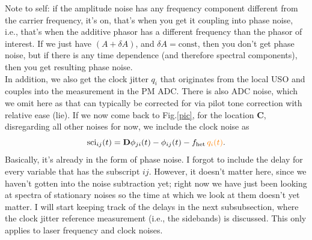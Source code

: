 \documentclass[11pt]{article}
\begin{document}
\noindent
Note to self: if the amplitude noise has any frequency component different from the carrier frequency, it's on, that's when you get it coupling into phase noise, i.e., that's when the additive phasor has a different frequency than the phasor of interest. If we just have $(A + \delta A)$, and $\delta A = \text{const}$, then you don't get phase noise, but if there is any time dependence (and therefore spectral components), then you get resulting phase noise.\\
\newline
In addition, we also get the clock jitter $q_i$ that originates from the local USO and couples into the measurement in the PM ADC. There is also ADC noise, which we omit here as that can typically be corrected for via pilot tone correction with relative ease (lie). If we now come back to Fig.\ref{pic}, for the location \textbf{C}, disregarding all other noises for now, we include the clock noise as
\begin{equation*}
    \text{sci}_{ij}(t)=\mathbf{D}\phi_{ji}(t)-\phi_{ij}(t)-f_{\text{het}}\,{\color{orange}q_{i}(t)}.
\end{equation*}
Basically, it's already in the form of phase noise. I forgot to include the delay for every variable that has the subscript $ij$. However, it doesn't matter here, since we haven't gotten into the noise subtraction yet; right now we have just been looking at spectra of stationary noises so the time at which we look at them doesn't yet matter. I will start keeping track of the delays in the next subsubsection, where the clock jitter reference measurement (i.e., the sidebands) is discussed. This only applies to laser frequency and clock noises.
\end{document}
